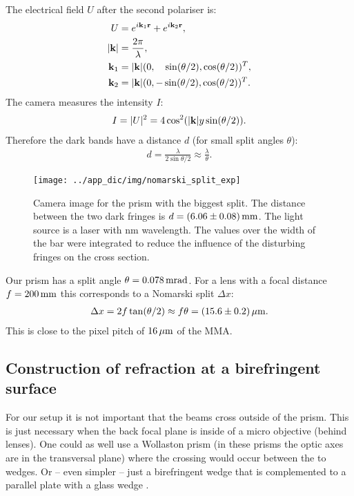 The electrical field $U$ after the second polariser is:
\begin{align}
  U&=e^{i\mathbf{k}_1\mathbf{r}}+e^{i\mathbf{k}_2\mathbf{r}},\\
  \mathopen| \mathbf{k} \mathclose|&=\frac{2\pi}{\lambda},\\
  \mathbf{k}_1&=\mathopen| \mathbf{k} \mathclose|(0, \hspace{1em}\sin(\theta/2), \cos(\theta/2))^T,\\
  \mathbf{k}_2&=\mathopen| \mathbf{k} \mathclose|(0, -\sin(\theta/2), \cos(\theta/2))^T.
\end{align}
The camera measures the intensity $I$:
\begin{align}
  I=\mathopen| U \mathclose|^2=4\cos^2(\mathopen| \mathbf{k} \mathclose|y\sin(\theta/2)).
\end{align}
Therefore the dark bands have a distance $d$ (for small split angles
$\theta$):
\begin{align}
  d=\frac{\lambda}{2\sin{\theta/2}}\approx \frac{\lambda}{\theta}.
\end{align}
\begin{figure}[htb]
  \centering
  \texttt{[image: ../app\_dic/img/nomarski\_split\_exp]}
  \caption{Camera image for the prism with the biggest split. The
    distance between the two dark fringes is
    $d=\unit[(6.06\pm0.08)]{mm}$. The light source is a laser with
    \unit[473]{nm} wavelength. The values over the width of the bar
    were integrated to reduce the influence of the disturbing fringes
    on the cross section.}
  \label{fig:nomarski_split_exp}
\end{figure}
Our prism has a split angle $\theta=\unit[0.078]{mrad}$.
For a lens with a focal distance $f=\unit[200]{mm}$ this corresponds to a
Nomarski split $\Delta x$:
\begin{align}
  \Delta x=2f\tan(\theta/2)\approx f\theta=\unit[(15.6\pm0.2)]{\mu m}.
\end{align}
This is close to the pixel pitch of $\unit[16]{\mu m}$ of the MMA.



\subsection{Construction of refraction at a birefringent surface}
\label{sec:raytrace}
For our setup it is not important that the beams cross outside of the
prism. This is just necessary when the back focal plane is inside of a
micro objective (behind lenses). One could as well use a Wollaston
prism (in these prisms the optic axes are in the transversal plane)
where the crossing would occur between the to wedges.  Or -- even
simpler -- just a birefringent wedge that is complemented to a
parallel plate with a glass wedge \cite{1960Nomarski}.

